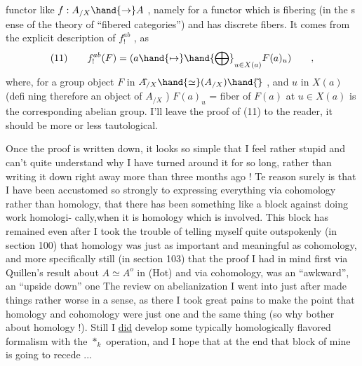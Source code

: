 
functor like $f : A_{/X} \hand{\to} A$ , namely for a functor which is fibering
(in the s ense of  the theory of ``fibered categories'') and has
discrete fibers. It comes from the explicit description of $f^{ab}_{!}$ ,
as
\[ (11) \qquad f^{ab}_{!}(F) = ( a \hand{\mapsto} \hand{\bigoplus}_{u\in X(a)} F(a)_u ) \qquad , \]
where, for a group object $F$ in $A\hat{}_{/X} \hand{\simeq} (A_{/X})\hand{\hat{}}$ , and $u$ in $X(a)$ (defi
ning therefore an object of $A_{/X}$ ) $F(a)_u$ = fiber of $F(a)$ at $u \in X(a)$\hand{,}
is the corresponding abelian group. I'll leave the proof of (11) to
the reader, it should be more or less tautological.

Once the  proof is written down, it looks so simple that I feel
rather stupid and can't quite understand why I have turned around it
for so long, rather than writing it down right away more than three
months ago ! Te reason surely is that I have been accustomed so
strongly to expressing everything via cohomology rather than homology,
that there has been something like a block against doing work homologi-%
cally,when it is homology which is involved. This block has remained
even after I took the trouble of telling myself quite outspokenly
(in section 100) that homology was just as important and meaningful
as cohomology, and more specifically still (in section 103) that the
proof I had in mind first\hand{,} via Quillen's result about $A \simeq A^{o}$ in (Hot)
and via cohomology, was an ``awkward'', an ``upside down'' one The
review on abelianization I went into just after made things rather
worse in a sense, as  there I took great pains to make
the point that homology and cohomology were just one and the same thing
(so why bother about homology !). Still I \uline{did} develop some typically
homologically flavored formalism with the $*_k$ operation, and I hope
that at the end that block of mine is going to recede  ...

